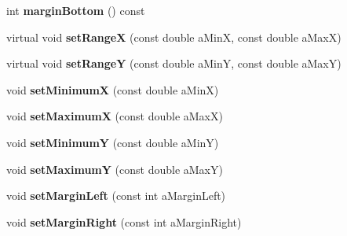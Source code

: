 \begin{DoxyCompactItemize}
\item 
\hypertarget{class_graph_view_abstract_a58e8a3f841205697bfbaf7d75f72a2ea}{int {\bfseries margin\-Bottom} () const }\label{class_graph_view_abstract_a58e8a3f841205697bfbaf7d75f72a2ea}

\item 
\hypertarget{class_graph_view_abstract_a97cca36fc10bab8692ef8ca6d3323c85}{virtual void {\bfseries set\-Range\-X} (const double a\-Min\-X, const double a\-Max\-X)}\label{class_graph_view_abstract_a97cca36fc10bab8692ef8ca6d3323c85}

\item 
\hypertarget{class_graph_view_abstract_a1d2c1352ea7b2594bcb3e85694326565}{virtual void {\bfseries set\-Range\-Y} (const double a\-Min\-Y, const double a\-Max\-Y)}\label{class_graph_view_abstract_a1d2c1352ea7b2594bcb3e85694326565}

\item 
\hypertarget{class_graph_view_abstract_a8f09cae3ae54857979bbca7d73ab756b}{void {\bfseries set\-Minimum\-X} (const double a\-Min\-X)}\label{class_graph_view_abstract_a8f09cae3ae54857979bbca7d73ab756b}

\item 
\hypertarget{class_graph_view_abstract_ab8ddc98e6ecf09aa657cf12e0592a76c}{void {\bfseries set\-Maximum\-X} (const double a\-Max\-X)}\label{class_graph_view_abstract_ab8ddc98e6ecf09aa657cf12e0592a76c}

\item 
\hypertarget{class_graph_view_abstract_a80bf17c643e18108a793a7b659b6586a}{void {\bfseries set\-Minimum\-Y} (const double a\-Min\-Y)}\label{class_graph_view_abstract_a80bf17c643e18108a793a7b659b6586a}

\item 
\hypertarget{class_graph_view_abstract_a116798c938fe714756411b06255f9986}{void {\bfseries set\-Maximum\-Y} (const double a\-Max\-Y)}\label{class_graph_view_abstract_a116798c938fe714756411b06255f9986}

\item 
\hypertarget{class_graph_view_abstract_a37de2d502fccd19585be81754fb72634}{void {\bfseries set\-Margin\-Left} (const int a\-Margin\-Left)}\label{class_graph_view_abstract_a37de2d502fccd19585be81754fb72634}

\item 
\hypertarget{class_graph_view_abstract_a8c2ab9cdcf82912bb46afc17de90f22c}{void {\bfseries set\-Margin\-Right} (const int a\-Margin\-Right)}\label{class_graph_view_abstract_a8c2ab9cdcf82912bb46afc17de90f22c}


\end{DoxyCompactItemize}
